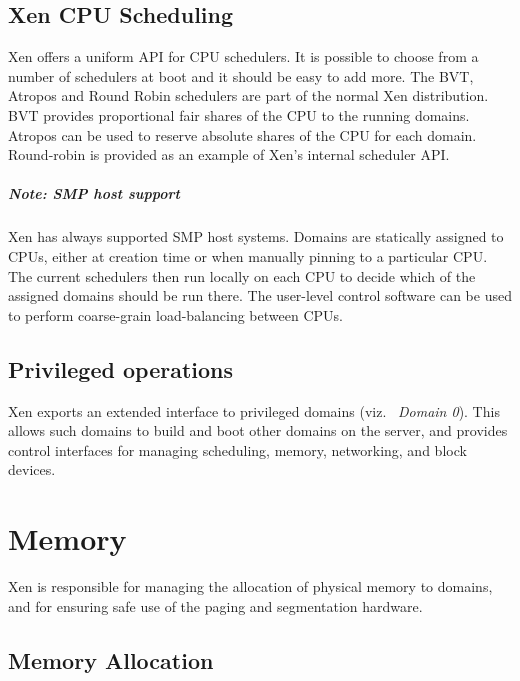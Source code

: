 \documentclass[11pt,twoside,final,openright]{xenstyle}
\begin{document}

\section{Xen CPU Scheduling}

Xen offers a uniform API for CPU schedulers.  It is possible to choose
from a number of schedulers at boot and it should be easy to add more.
The BVT, Atropos and Round Robin schedulers are part of the normal
Xen distribution.  BVT provides proportional fair shares of the CPU to
the running domains.  Atropos can be used to reserve absolute shares
of the CPU for each domain.  Round-robin is provided as an example of
Xen's internal scheduler API.

\paragraph*{Note: SMP host support}
Xen has always supported SMP host systems.  Domains are statically assigned to
CPUs, either at creation time or when manually pinning to a particular CPU.
The current schedulers then run locally on each CPU to decide which of the
assigned domains should be run there. The user-level control software 
can be used to perform coarse-grain load-balancing between CPUs. 




\section{Privileged operations}

Xen exports an extended interface to privileged domains (viz.\ {\it
  Domain 0}). This allows such domains to build and boot other domains 
on the server, and provides control interfaces for managing 
scheduling, memory, networking, and block devices. 


\chapter{Memory}
\label{c:memory} 

Xen is responsible for managing the allocation of physical memory to
domains, and for ensuring safe use of the paging and segmentation
hardware.


\section{Memory Allocation}
\end{document}
